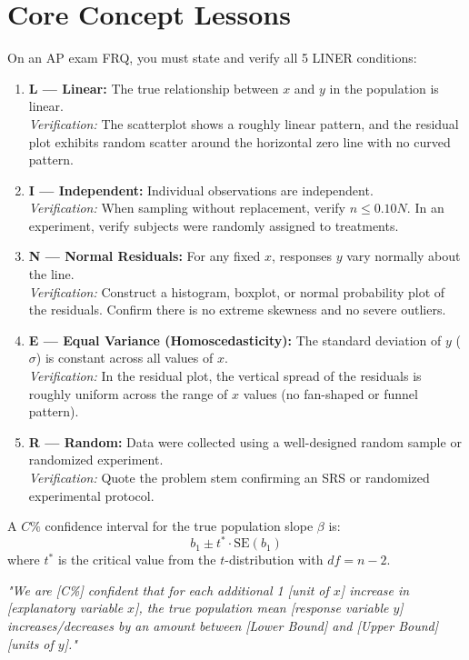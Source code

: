 \section{Core Concept Lessons}

\begin{lessonbox}
On an AP exam FRQ, you must state and verify all 5 LINER conditions:
\begin{enumerate}[leftmargin=1.5em]
  \item \textbf{L --- Linear:} The true relationship between $x$ and $y$ in the population is linear.\\
  \textit{Verification:} The scatterplot shows a roughly linear pattern, and the residual plot exhibits random scatter around the horizontal zero line with no curved pattern.
  \item \textbf{I --- Independent:} Individual observations are independent.\\
  \textit{Verification:} When sampling without replacement, verify $n \le 0.10N$. In an experiment, verify subjects were randomly assigned to treatments.
  \item \textbf{N --- Normal Residuals:} For any fixed $x$, responses $y$ vary normally about the line.\\
  \textit{Verification:} Construct a histogram, boxplot, or normal probability plot of the residuals. Confirm there is no extreme skewness and no severe outliers.
  \item \textbf{E --- Equal Variance (Homoscedasticity):} The standard deviation of $y$ ($\sigma$) is constant across all values of $x$.\\
  \textit{Verification:} In the residual plot, the vertical spread of the residuals is roughly uniform across the range of $x$ values (no fan-shaped or funnel pattern).
  \item \textbf{R --- Random:} Data were collected using a well-designed random sample or randomized experiment.\\
  \textit{Verification:} Quote the problem stem confirming an SRS or randomized experimental protocol.
\end{enumerate}
\end{lessonbox}

\begin{lessonbox}
A $C\%$ confidence interval for the true population slope $\beta$ is:
\begin{equation}
  b_1 \pm t^* \cdot \text{SE}(b_1)
\end{equation}
where $t^*$ is the critical value from the $t$-distribution with $df = n - 2$.

\begin{frqrubricbox}
\textit{"We are [C\%] confident that for each additional 1 [unit of $x$] increase in [explanatory variable $x$], the true population mean [response variable $y$] increases/decreases by an amount between [Lower Bound] and [Upper Bound] [units of $y$]."}
\end{frqrubricbox}
\end{lessonbox}

